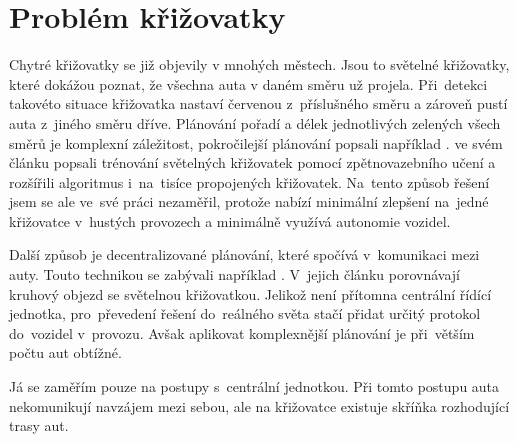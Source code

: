 \section{Problém křižovatky}\label{sec:problem}



Chytré křižovatky se již objevily v mnohých městech.
Jsou to světelné křižovatky, které dokážou poznat, že všechna auta v daném směru už projela.
Při~detekci takovéto situace křižovatka nastaví červenou z~příslušného směru a zároveň pustí auta z~jiného směru dříve.
Plánování pořadí a délek jednotlivých zelených všech směrů je komplexní záležitost, pokročilejší plánování popsali například \citet*{Goldstein}.
\citet*{Liang} ve svém článku popsali trénování světelných křižovatek pomocí zpětnovazebního učení
a rozšířili algoritmus i~na~tisíce propojených křižovatek.
Na~tento způsob řešení jsem se ale ve~své práci nezaměřil, protože nabízí minimální zlepšení
na~jedné křižovatce v~hustých provozech a minimálně využívá autonomie vozidel.

Další způsob je decentralizované plánování, které spočívá v~komunikaci mezi auty.
Touto technikou se zabývali například \citet*{Wu}.
V~jejich článku porovnávají kruhový objezd se světelnou křižovatkou.
Jelikož není přítomna centrální řídící jednotka, pro~převedení řešení
do~reálného světa stačí přidat určitý protokol do~vozidel v~provozu.
Avšak aplikovat komplexnější plánování je při~větším počtu aut obtížné.

Já se zaměřím pouze na postupy s~centrální jednotkou.
Při tomto postupu auta nekomunikují navzájem mezi sebou, ale na křižovatce existuje skříňka rozhodující trasy aut.
